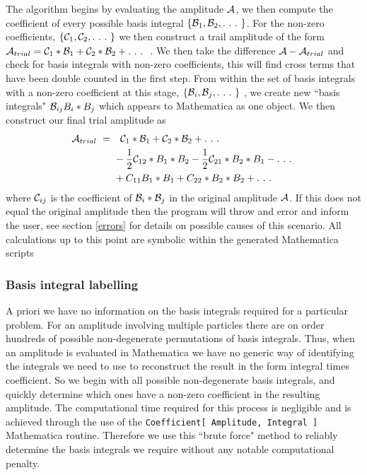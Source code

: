 The algorithm begins by evaluating the amplitude $\mathcal{A}$, we then compute the coefficient of every possible basis integral $\{\B_1,\B_2,.\ .\ .\ \}$.  For the non-zero coefficients, $\{\mathcal{C}_1,\mathcal{C}_2, .\ .\ .\  \}$ we then construct a trail amplitude of the form $\mathcal{A}_{trial} = \mathcal{C}_1 * \mathcal{B}_1 + \mathcal{C}_2 * \mathcal{B}_2 + .\ .\ .\ $ .  We then take the difference $\mathcal{A} - \mathcal{A}_{trial}$ and check for basis integrals with non-zero coefficients, this will find cross terms that have been double counted in the first step.  From within the set of basis integrals with a non-zero coefficient at this stage, $\{\mathcal{B}_i,\mathcal{B}_j,.\ .\ .\ \}$ , we create new ``basis integrals" $\mathcal{B}_{ij}  B_i*B_j$ which appears to Mathematica as one object.  We then construct our final trial amplitude as
\begin{align*}
 \A_{trial}\ = \ & \ \ \C_1 * \B_1 + \C_2 * \B_2 + .\ .\ .\ \\ 
  &-\frac{1}{2} \C_{12} * B_1*B_2  -\frac{1}{2} \C_{21} * B_2*B_1 - .\ .\ .\ \\
  & + C_{11} B_1*B_1 + C_{22}*B_2*B_2 + .\ .\ .\ 
\end{align*}
where $ \mathcal{C}_{ij}$ is the coefficient of  $\mathcal{B}_i*\mathcal{B}_j$ in the original amplitude $\mathcal{A}$.  If this does not equal the original amplitude then the program will throw and error and inform the user, see section \ref{errors} for details on possible causes of this scenario.  All calculations up to this point are symbolic within the generated Mathematica scripts

\subsubsection{Basis integral labelling}

A priori we have no information on the basis integrals required for a particular problem.  For an amplitude involving multiple particles there are on order hundreds of possible non-degenerate permutations of basis integrals.  Thus, when an amplitude is evaluated in Mathematica we have no generic way of identifying the integrals we need to use to reconstruct the result in the form integral times coefficient.  So we begin with all possible non-degenerate basis integrals, and quickly determine which ones have a non-zero coefficient in the resulting amplitude.  The computational time required for this process is negligible and is achieved through the use of the \lstinline{Coefficient[ Amplitude, Integral ] } Mathematica routine.  Therefore we use this ``brute force" method to reliably determine the basis integrals we require without any notable computational penalty.

